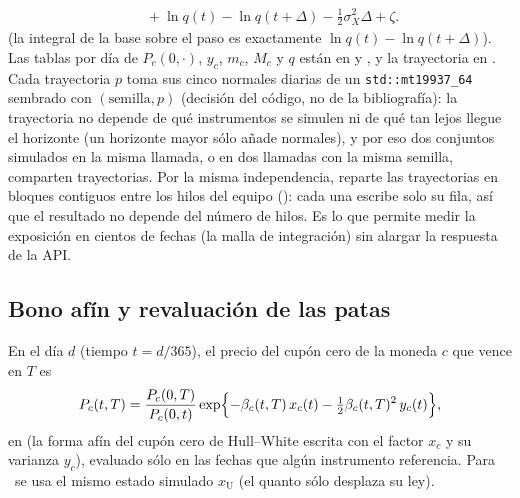 \begin{sloppypar}
\begin{equation}
\begin{aligned}
  &\quad+\ln q(t)-\ln q(t+\Delta)-\tfrac12\sigma_X^{2}\Delta+\zeta .
\end{aligned}
\end{equation}
(la integral de la base sobre el paso es exactamente $\ln q(t)-\ln q(t+\Delta)$). Las tablas por día de $P_c(0,\cdot)$,
$y_c$, $m_c$, $M_c$ y $q$ están en  y
, y la trayectoria en
. Cada trayectoria $p$ toma sus cinco normales diarias de un
\texttt{std::mt19937\_64} sembrado con $(\text{semilla},p)$ (decisión del código, no de la bibliografía): la trayectoria no depende
de qué instrumentos se simulen ni de qué tan lejos llegue el horizonte (un horizonte mayor sólo añade normales), y
por eso dos conjuntos simulados en la misma llamada, o en dos llamadas con la misma semilla, comparten trayectorias.
Por la misma independencia,  reparte las trayectorias en
bloques contiguos entre los hilos del equipo (): cada una escribe solo
su fila, así que el resultado no depende del número de hilos. Es lo que permite medir la exposición en cientos de fechas
(la malla de integración) sin alargar la respuesta de la API.

\subsection{Bono afín y revaluación de las patas}\label{sec:cap14-patas}

En el día $d$ (tiempo $t=d/365$), el precio del cupón cero de la moneda $c$ que vence en $T$ es
\begin{equation}\label{eq:cap14-bono}
  P_c(t,T)=\frac{P_c(0,T)}{P_c(0,t)}\exp\Bigl\{-\beta_c(t,T)\,x_c(t)-\tfrac12\beta_c(t,T)^{2}\,y_c(t)\Bigr\},
\end{equation}
en  (la forma afín del cupón cero de Hull--White
\citep[cap.~3]{brigo2006} escrita con el factor $x_c$ y su varianza $y_c$), evaluado sólo en las fechas que algún instrumento
referencia. Para \USD\ se usa el mismo estado simulado $x_{\mathrm U}$ (el quanto sólo desplaza su ley).


\end{sloppypar}
